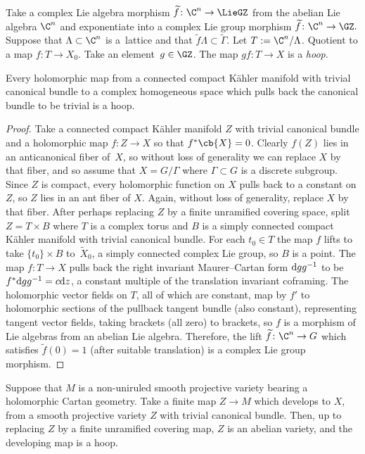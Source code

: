 Take a complex Lie algebra morphism
$
\widetilde{f} \colon \C^{n} \to \LieGZ
$
from the abelian Lie algebra $\C^{n}$ and exponentiate into a complex Lie group morphism
$
\widetilde{f} \colon \C^{n} \to \GZ.
$
Suppose that $\Lambda \subset \C^{n}$ is a~lattice and that $\widetilde{f}\Lambda \subset \widetilde{\Gamma}$.
Let $T := \C^{n}/\Lambda$.
Quotient to a map $f \colon T \to X_0$.
Take an element~${g \in \GZ}$.
The map $gf \colon T \to X$ is a \emph{hoop}.

\begin{Lemma}\label{lemma:is.a.hoop}
Every holomorphic map from a connected compact K\"ahler manifold with trivial canonical bundle to a complex homogeneous space which pulls back the canonical bundle to be trivial is a hoop.
\end{Lemma}

\begin{proof}
Take a connected compact K\"ahler manifold $Z$ with trivial canonical bundle and a holomorphic map $f \colon Z \to X$ so that $f^* \cb{X}=0$.
Clearly $f(Z)$ lies in an anticanonical fiber of~$X$, so without loss of generality we can replace $X$ by that fiber, and so assume that $X=G/\Gamma$ where $\Gamma \subset G$ is a discrete subgroup.
Since $Z$ is compact, every holomorphic function on $X$ pulls back to a constant on $Z$, so $Z$ lies in an ant fiber of $X$.
Again, without loss of generality, replace $X$ by that fiber.
After perhaps replacing $Z$ by a finite unramified covering space, split~$Z = T \times B$ where $T$ is a complex torus and $B$ is a simply connected compact K\"ahler manifold with trivial canonical bundle.
For each $t_0 \in T$ the map $f$ lifts to take $\{t_0\} \times B$ to~$\widetilde{X}_0$, a simply connected complex Lie group, so $B$ is a point.
The map $f \colon T \to X$ pulls back the right invariant Maurer--Cartan form ${\rm d}g g^{-1}$ to be $f^* {\rm d}g g^{-1}
 = c {\rm d}z$, a constant multiple of the translation invariant coframing.
The holomorphic vector fields on $T$, all of which are constant, map by $f'$ to holomorphic sections of the pullback tangent bundle (also constant), representing tangent vector fields, taking brackets (all zero) to brackets, so $f$ is a morphism of Lie algebras from an abelian Lie algebra.
Therefore, the lift $\widetilde{f} \colon \C^{n} \to G$ which satisfies $\widetilde{f}(0)=1$ (after suitable translation) is a complex Lie group morphism.
\end{proof}
\begin{Corollary}\label{corollary:hoops}
Suppose that $M$ is a non-uniruled smooth projective variety bearing a holomorphic Cartan geometry.
Take a finite map $Z \to M$ which develops to $X$, from a smooth projective variety $Z$ with trivial canonical bundle.
Then, up to replacing $Z$ by a finite unramified covering map, $Z$ is an abelian variety, and the developing map is a hoop.
\end{Corollary}

